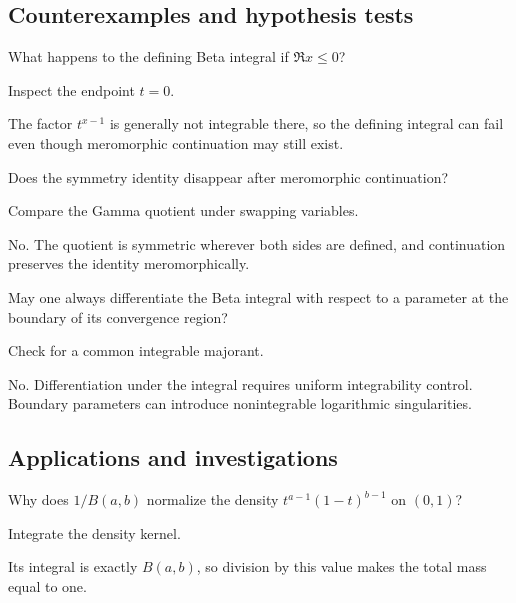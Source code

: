 \subsection*{Counterexamples and hypothesis tests}

\begin{exercise}\label{exr:iv20-expand-10}
What happens to the defining Beta integral if \(\Re x\le0\)?
\end{exercise}
\begin{hint}
Inspect the endpoint \(t=0\).
\end{hint}
\begin{solution}
The factor \(t^{x-1}\) is generally not integrable there, so the defining integral can fail even though meromorphic continuation may still exist.
\end{solution}

\begin{exercise}\label{exr:iv20-expand-11}
Does the symmetry identity disappear after meromorphic continuation?
\end{exercise}
\begin{hint}
Compare the Gamma quotient under swapping variables.
\end{hint}
\begin{solution}
No. The quotient is symmetric wherever both sides are defined, and continuation preserves the identity meromorphically.
\end{solution}

\begin{exercise}\label{exr:iv20-expand-12}
May one always differentiate the Beta integral with respect to a parameter at the boundary of its convergence region?
\end{exercise}
\begin{hint}
Check for a common integrable majorant.
\end{hint}
\begin{solution}
No. Differentiation under the integral requires uniform integrability control. Boundary parameters can introduce nonintegrable logarithmic singularities.
\end{solution}

\subsection*{Applications and investigations}

\begin{exercise}\label{exr:iv20-expand-13}
Why does \(1/B(a,b)\) normalize the density \(t^{a-1}(1-t)^{b-1}\) on \((0,1)\)?
\end{exercise}
\begin{hint}
Integrate the density kernel.
\end{hint}
\begin{solution}
Its integral is exactly \(B(a,b)\), so division by this value makes the total mass equal to one.
\end{solution}

